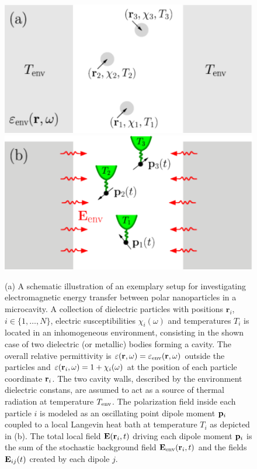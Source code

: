 \begin{figure}
 \includegraphics[width=.49\columnwidth]{pics/dipole_pic1a.pdf}
 \includegraphics[width=.49\columnwidth]{pics/dipole_pic1b.pdf}
 \caption{(a) A schematic illustration of an exemplary setup for investigating electromagnetic energy transfer between polar nanoparticles in a microcavity. A collection of dielectric particles with positions $\mathbf{r}_i$, $i\in\{1,\dots,N\}$, electric susceptibilities $\chi_i(\omega)$ and temperatures $T_i$ is located in an inhomogeneous environment, consisting in the shown case of two dielectric (or metallic) bodies forming a cavity. The overall relative permittivity is $\varepsilon(\mathbf{r},\omega)=\varepsilon_{\textrm{env}}(\mathbf{r},\omega)$ outside the particles and $\varepsilon(\mathbf{r}_i,\omega)=1+\chi_i(\omega)$ at the position of each particle coordinate $\mathbf{r}_i$. The two cavity walls, described by the environment dielectric constans, are assumed to act as a source of thermal radiation at temperature $T_{\textrm{env}}$. The polarization field inside each particle $i$ is modeled as an oscillating point dipole moment $\mathbf{p}_i$ coupled to a local Langevin heat bath at temperature $T_i$ as depicted in (b). The total local field $\mathbf{E}(\mathbf{r}_i,t)$ driving each dipole moment $\mathbf{p}_i$ is the sum of the stochastic background field $\mathbf{E}_{\textrm{env}}(\mathbf{r}_i,t)$ and the fields $\mathbf{E}_{ij}(t)$ created by each dipole $j$.}%
\label{fig:gfm_dipole_system}
\end{figure}

